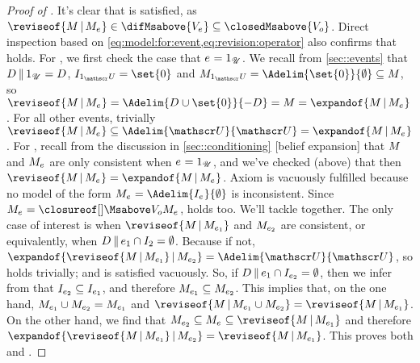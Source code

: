 \documentclass[preprint]{isipta2025}
\begin{document}
\begin{proof}[Proof of ]
It's clear that  is satisfied, as \(\reviseof{\M\given\eventM}\in\difMsabove{\eventbgM}\subseteq\closedMsabove{\zeroM}\).
Direct inspection based on \cref{eq:model:for:event,eq:revision:operator} also confirms that  holds.
For , we first check the case that \(\eventopt=\uniteventopt\).
We recall from \cref{sec::events} that \(\desirset\altcondon\uniteventopt=\desirset\), \(\indifset[\uniteventopt]=\set{0}\) and \(\eventM[\uniteventopt]=\Adelim{\set{0}}{\emptyset}\subseteq\M\), so \(\reviseof{\M\given\eventM}=\Adelim{\desirset\cup\set{0}}{-\desirset}=\M=\expandof{\M\given\eventM}\).
For all other events, trivially \(\reviseof{\M\given\eventM}\subseteq\Adelim{\opts}{\opts}=\expandof{\M\given\eventM}\).
For , recall from the discussion  in \cref{sec::conditioning} [belief expansion] that \(\M\) and \(\eventM\) are only consistent when \(\eventopt=\uniteventopt\), and we've checked (above) that then \(\reviseof{\M\given\eventM}=\expandof{\M\given\eventM}\).
Axiom  is vacuously fulfilled because no model of the form \(\eventM=\Adelim{\eventindifset}{\emptyset}\) is inconsistent.
Since \(\eventM = \Mclsbgof{\zeroM}{\eventM}\),  holds too.
We'll tackle  together.
The only case of interest is when \(\reviseof{\M\given\indexedeventM[1]}\) and \(\indexedeventM[2]\) are consistent, or equivalently, when \(\desirset\altcondon{\eventopt[1]}\cap\indifset[2]=\emptyset\).
Because if not, \(\expandof{\reviseof{\M\given\indexedeventM[1]}\given\indexedeventM[2]}=\Adelim{\opts}{\opts}\), so  holds trivially; and  is satisfied vacuously.
So, if \(\desirset\altcondon{\eventopt[1]}\cap\eventindifset[2]=\emptyset\), then we infer from  that \(\eventindifset[2]\subseteq\eventindifset[1]\), and therefore \(\indexedeventM[1]\subseteq\indexedeventM[2]\).
This implies that, on the one hand, \(\indexedeventM[1]\cup\indexedeventM[2]=\indexedeventM[1]\) and \(\reviseof{\M\given\indexedeventM[1]\cup\indexedeventM[2]}=\reviseof{\M\given\indexedeventM[1]}\).
On the other hand, we find that \(\indexedeventM[2]\subseteq\indexedeventM\subseteq\reviseof{\M\given\indexedeventM[1]}\) and therefore \(\expandof{\reviseof{\M\given\indexedeventM[1]}\given\indexedeventM[2]}=\reviseof{\M\given\indexedeventM[1]}\).
This proves both  and .
\end{proof}
\end{document}

